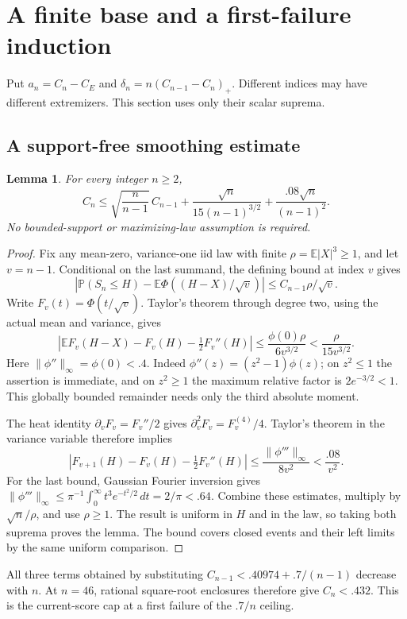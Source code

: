 \documentclass[11pt,a4paper]{article}
\numberwithin{equation}{section}
\newtheorem{lemma}[theorem]{Lemma}
\theoremstyle{definition}
\theoremstyle{remark}
\begin{document}
\section{A finite base and a first-failure induction}\label{cut49:global:route}
Put $a_n=C_n-C_E$ and $\delta_n=n(C_{n-1}-C_n)_+$.
Different indices may have different extremizers. This section uses
only their scalar suprema.

\subsection{A support-free smoothing estimate}
\begin{lemma}\label{cut49:global:smoothing}
For every integer $n\ge2$,
\[
 C_n\le\sqrt{\frac n{n-1}}\,C_{n-1}
       +\frac{\sqrt n}{15(n-1)^{3/2}}
       +\frac{.08\sqrt n}{(n-1)^2}.
\]
No bounded-support or maximizing-law assumption is required.
\end{lemma}
\begin{proof}
Fix any mean-zero, variance-one iid law with finite
$\rho=\mathbb E|X|^3\ge1$, and let $v=n-1$. Conditional on the last
summand, the defining bound at index $v$ gives
\[
 \left|\mathbb P(S_n\le H)-\mathbb E\Phi((H-X)/\sqrt v)\right|
       \le C_{n-1}\rho/\sqrt v.
\]
Write $F_v(t)=\Phi(t/\sqrt v)$. Taylor's theorem through degree two,
using the actual mean and variance, gives
\[
 \left|\mathbb E F_v(H-X)-F_v(H)-\tfrac12F_v''(H)\right|
       \le\frac{\phi(0)\rho}{6v^{3/2}}<\frac{\rho}{15v^{3/2}}.
\]
Here $\|\phi''\|_\infty=\phi(0)<.4$. Indeed
$\phi''(z)=(z^2-1)\phi(z)$; on $z^2\le1$ the assertion is immediate,
and on $z^2\ge1$ the maximum relative factor is $2e^{-3/2}<1$.
This globally bounded remainder needs only the third absolute moment.

The heat identity $\partial_vF_v=F_v''/2$ gives
$\partial_v^2F_v=F_v^{(4)}/4$. Taylor's theorem in the variance
variable therefore implies
\[
 |F_{v+1}(H)-F_v(H)-\tfrac12F_v''(H)|
 \le\frac{\|\phi'''\|_\infty}{8v^2}<\frac{.08}{v^2}.
\]
For the last bound, Gaussian Fourier inversion gives
$\|\phi'''\|_\infty\le\pi^{-1}\int_0^\infty
t^3e^{-t^2/2}\,dt=2/\pi<.64$.
Combine these estimates, multiply by $\sqrt n/\rho$, and use
$\rho\ge1$. The result is uniform in $H$ and in the law, so taking
both suprema proves the lemma. The bound covers closed events and
their left limits by the same uniform comparison.
\end{proof}

All three terms obtained by substituting
$C_{n-1}<.40974+.7/(n-1)$ decrease with $n$. At $n=46$, rational
square-root enclosures therefore give $C_n<.432$. This is the
current-score cap at a first failure of the $.7/n$ ceiling.
\end{document}
